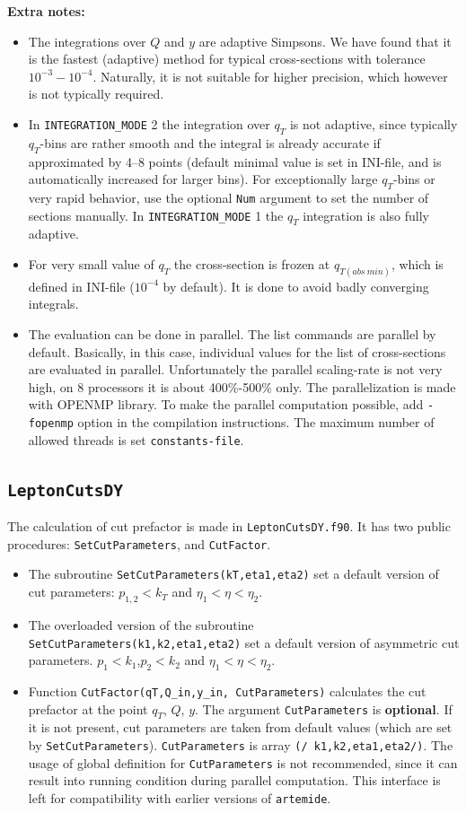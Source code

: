 \documentclass[prd,nofootinbib,eqsecnum,final]{revtex4}
\renewcommand{\(}{\left(}
\renewcommand{\)}{\right)}
\renewcommand{\[}{\left[}
\renewcommand{\]}{\right]}
\begin{document}
\textbf{Extra notes:}
\begin{itemize}
\item The integrations over $Q$ and $y$ are adaptive Simpsons. We have found that it is the fastest (adaptive) method for typical cross-sections with tolerance $10^{-3}-10^{-4}$. Naturally, it is not suitable for higher precision, which however is not typically required.
\item In \texttt{INTEGRATION\_MODE} 2 the integration over $q_T$ is not adaptive, since typically $q_T$-bins are rather smooth and the integral is already accurate if approximated by 4--8 points (default minimal value is set in INI-file, and is automatically increased for larger bins). For exceptionally large $q_T$-bins or very rapid behavior, use the optional \texttt{Num} argument to set the number of sections manually. In \texttt{INTEGRATION\_MODE} 1 the $q_T$ integration is also fully adaptive.
\item For very small value of $q_T$ the cross-section is frozen at $q_{T(abs~min)}$, which is defined in INI-file ($10^{-4}$ by default). It is done to avoid badly converging integrals.
\item The evaluation can be done in parallel. The list commands are parallel by default. Basically, in this case, individual values for the list of cross-sections are evaluated in parallel. Unfortunately the parallel scaling-rate is not very high, on 8 processors it is about 400\%-500\% only. The parallelization is made with OPENMP library. To make the parallel computation possible, add \texttt{-fopenmp} option in the compilation instructions. The maximum number of allowed threads is set \texttt{constants-file}.
\end{itemize}


\subsection{\texttt{LeptonCutsDY}}

The calculation of cut prefactor is made in \texttt{LeptonCutsDY.f90}. It has two public procedures: \texttt{SetCutParameters}, and \texttt{CutFactor}. 
\begin{itemize}
\item The subroutine \texttt{SetCutParameters(kT,eta1,eta2)} set a default version of cut parameters: $p_{1,2}<k_T$ and $\eta_1<\eta<\eta_2$.
\item The overloaded version of the subroutine \texttt{SetCutParameters(k1,k2,eta1,eta2)} set a default version of asymmetric cut parameters. $p_{1}<k_1$,$p_2<k_2$ and $\eta_1<\eta<\eta_2$.
\item Function \texttt{CutFactor(qT,Q\_in,y\_in, CutParameters)} calculates the cut prefactor at the point $q_T$, $Q$, $y$. The argument \texttt{CutParameters} is \textbf{optional}. If it is not present, cut parameters are taken from default values (which are set by \texttt{SetCutParameters}). \texttt{CutParameters} is array \texttt{(/ k1,k2,eta1,eta2/)}. The usage of global definition for \texttt{CutParameters} is not recommended, since it can result into running condition during parallel computation. This interface is left for compatibility with earlier versions of \texttt{artemide}.
\end{itemize} 
\end{document}
